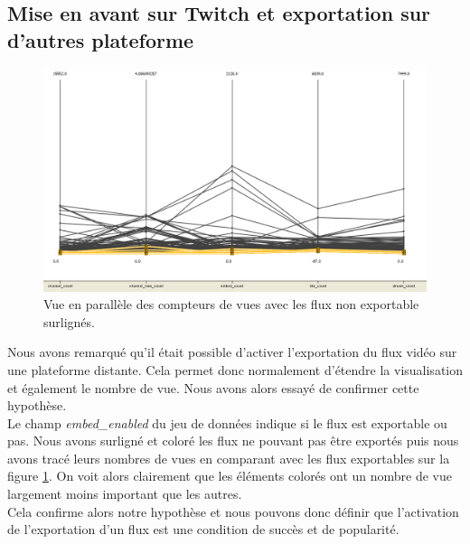 \documentclass[11pt, a4paper, titlepage]{scrartcl}
\begin{document}
\subsection{Mise en avant sur Twitch et exportation sur d'autres plateforme}
\begin{figure}[h]
    \centering
    \includegraphics[width=\textwidth]{images/embed_enabled_influence}
    \caption{\label{fig:embed_enabled_influence} Vue en parallèle des compteurs
        de vues avec les flux non exportable surlignés.}
\end{figure}

Nous avons remarqué qu'il était possible d'activer l'exportation du flux vidéo
sur une plateforme distante. Cela permet donc normalement d'étendre la
visualisation et également le nombre de vue. Nous avons alors essayé de
confirmer cette hypothèse. \\

Le champ \textit{embed\_enabled} du jeu de données indique si le flux est
exportable ou pas. Nous avons surligné et coloré les flux ne pouvant pas être
exportés puis nous avons tracé leurs nombres de vues en comparant avec les flux
exportables sur la figure \ref{fig:embed_enabled_influence}. On voit alors
clairement que les éléments colorés ont un nombre de vue largement moins
important que les autres. \\

Cela confirme alors notre hypothèse et nous pouvons donc définir que
l'activation de l'exportation d'un flux est une condition de succès et de
popularité. \\
\end{document}
